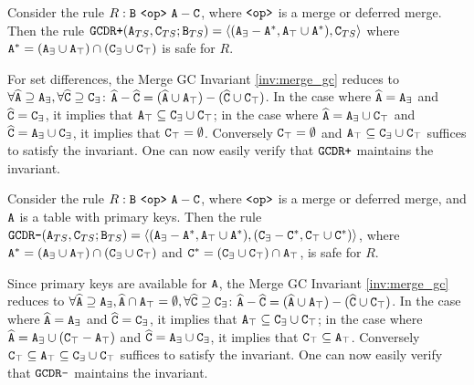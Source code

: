 \begin{example}
Consider the rule $R: \tt{B} ~\tt{<op>}~ \tt{A} - \tt{C}$, where $\tt{<op>}$ is a merge or deferred merge.
Then the rule $\tt{GCDR+}(\tt{A}_{TS}, \tt{C}_{TS}; \tt{B}_{TS}) = \langle (\tt{A}_\exists - \tt{A}^*, \tt{A}_\top \cup \tt{A}^*), \tt{C}_{TS}\rangle$
where $\tt{A}^* = (\tt{A}_\exists \cup \tt{A}_\top) \cap (\tt{C}_\exists \cup \tt{C}_\top)$
is safe for $R$.
\end{example}
For set differences, the Merge GC Invariant \ref{inv:merge_gc} reduces to
$\forall \widehat{\tt{A}} \supseteq \tt{A}_\exists, \forall \widehat{\tt{C}} \supseteq \tt{C}_\exists$: $\widehat{\tt{A}} - \widehat{\tt{C}} = (\widehat{\tt{A}} \cup \tt{A}_\top) - (\widehat{\tt{C}} \cup \tt{C}_\top)$.
In the case where $\widehat{\tt{A}} = \tt{A}_\exists$ and $\widehat{\tt{C}} = \tt{C}_\exists$, it implies that $\tt{A}_\top \subseteq \tt{C}_\exists \cup \tt{C}_\top$;
in the case where $\widehat{\tt{A}} = \tt{A}_\exists \cup \tt{C}_\top$ and $\widehat{\tt{C}} = \tt{A}_\exists \cup \tt{C}_\exists$, it implies that $\tt{C}_\top = \emptyset$.
Conversely $\tt{C}_\top = \emptyset$ and $\tt{A}_\top \subseteq \tt{C}_\exists \cup \tt{C}_\top$ suffices to satisfy the invariant.
One can now easily verify that $\tt{GCDR+}$ maintains the invariant.

\begin{example}
Consider the rule $R: \tt{B} ~\tt{<op>}~ \tt{A} - \tt{C}$, where $\tt{<op>}$ is a merge or deferred merge, and $\tt{A}$ is a table with primary keys.
Then the rule $\tt{GCDR-}(\tt{A}_{TS}, \tt{C}_{TS}; \tt{B}_{TS}) = \langle (\tt{A}_\exists - \tt{A}^*, \tt{A}_\top \cup \tt{A}^*), (\tt{C}_\exists - \tt{C}^*, \tt{C}_\top \cup \tt{C}^*)\rangle$,
where $\tt{A}^* = (\tt{A}_\exists \cup \tt{A}_\top) \cap (\tt{C}_\exists \cup \tt{C}_\top)$ and $\tt{C}^* = (\tt{C}_\exists \cup \tt{C}_\top) \cap \tt{A}_\top$,
is safe for $R$.
\end{example}
Since primary keys are available for $\tt{A}$, the Merge GC Invariant \ref{inv:merge_gc} reduces to
$\forall \widehat{\tt{A}} \supseteq \tt{A}_\exists, \widehat{\tt{A}} \cap \tt{A}_\top = \emptyset, \forall \widehat{\tt{C}} \supseteq \tt{C}_\exists$: $\widehat{\tt{A}} - \widehat{\tt{C}} = (\widehat{\tt{A}} \cup \tt{A}_\top) - (\widehat{\tt{C}} \cup \tt{C}_\top)$.
In the case where $\widehat{\tt{A}} = \tt{A}_\exists$ and $\widehat{\tt{C}} = \tt{C}_\exists$, it implies that $\tt{A}_\top \subseteq \tt{C}_\exists \cup \tt{C}_\top$;
in the case where $\widehat{\tt{A}} = \tt{A}_\exists \cup (\tt{C}_\top - \tt{A}_\top)$ and $\widehat{\tt{C}} = \tt{A}_\exists \cup \tt{C}_\exists$, it implies that $\tt{C}_\top \subseteq \tt{A}_\top$.
Conversely $\tt{C}_\top \subseteq \tt{A}_\top \subseteq \tt{C}_\exists \cup \tt{C}_\top$ suffices to satisfy the invariant.
One can now easily verify that $\tt{GCDR-}$ maintains the invariant.





